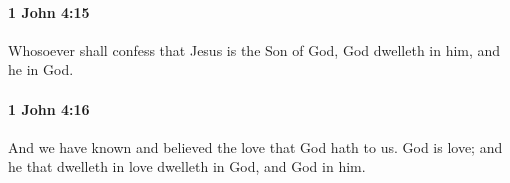 		\paragraph{1 John 4:15} %
			\label{1JOHN-4-15}

			Whosoever shall confess that Jesus is the Son of God, God dwelleth in him, and he in God.

			\begin{framed}
			\scriptsize
				\begin{compactdesc}
					\item[SBLG] 
				\end{compactdesc}
			\end{framed}

		\paragraph{1 John 4:16} %
			\label{1JOHN-4-16}

			And we have known and believed the love that God hath to us.  God is love; and he that dwelleth in love dwelleth in God, and God in him.

